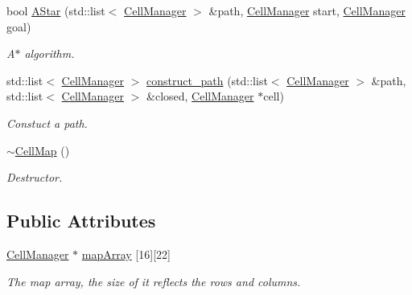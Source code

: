 \begin{DoxyCompactItemize}
bool \mbox{\hyperlink{class_cell_map_ac3abe891a8076fd0f9d134de4f1d55b4}{A\+Star}} (std\+::list$<$ \mbox{\hyperlink{class_cell_manager}{Cell\+Manager}} $>$ \&path, \mbox{\hyperlink{class_cell_manager}{Cell\+Manager}} start, \mbox{\hyperlink{class_cell_manager}{Cell\+Manager}} goal)
\begin{DoxyCompactList}\small\item\em A$\ast$ algorithm. \end{DoxyCompactList}\item 
std\+::list$<$ \mbox{\hyperlink{class_cell_manager}{Cell\+Manager}} $>$ \mbox{\hyperlink{class_cell_map_a38deb8b7767412f9d169d902614f954b}{construct\+\_\+path}} (std\+::list$<$ \mbox{\hyperlink{class_cell_manager}{Cell\+Manager}} $>$ \&path, std\+::list$<$ \mbox{\hyperlink{class_cell_manager}{Cell\+Manager}} $>$ \&closed, \mbox{\hyperlink{class_cell_manager}{Cell\+Manager}} $\ast$cell)
\begin{DoxyCompactList}\small\item\em Constuct a path. \end{DoxyCompactList}\item 
\mbox{\label{class_cell_map_a6819c9a8c9b4032eb7fbc03d2b84f512}} 
\mbox{\hyperlink{class_cell_map_a6819c9a8c9b4032eb7fbc03d2b84f512}{$\sim$\+Cell\+Map}} ()
\begin{DoxyCompactList}\small\item\em Destructor. \end{DoxyCompactList}\end{DoxyCompactItemize}
\subsection*{Public Attributes}
\begin{DoxyCompactItemize}
\item 
\mbox{\label{class_cell_map_ae662e21dea4d8b98350a7af1d5261836}} 
\mbox{\hyperlink{class_cell_manager}{Cell\+Manager}} $\ast$ \mbox{\hyperlink{class_cell_map_ae662e21dea4d8b98350a7af1d5261836}{map\+Array}} \mbox{[}16\mbox{]}\mbox{[}22\mbox{]}
\begin{DoxyCompactList}\small\item\em The map array, the size of it reflects the rows and columns. \end{DoxyCompactList}\end{DoxyCompactItemize}
